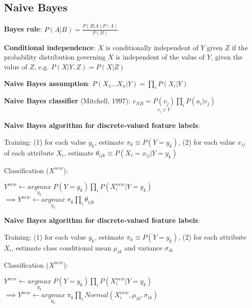 \documentclass[letterpaper,fontsize=5pt]{scrartcl}
\renewenvironment{enumerate}[1]{\begin{compactenum}#1}{\end{compactenum}}
\theoremstyle{definition}
\begin{document}
\begin{multicols}{2}
\section{Naive Bayes}
	\begin{enumerate}
		\item \textbf{Bayes rule}: $P(A|B) = \frac{P(B|A)P(A)}{P(B)}$
		\item \textbf{Conditional independence}: $X$ is conditionally independent of $Y$ given $Z$ if the probability distribution governing $X$ is independent of the value of $Y$, given the value of $Z$, e.g. $P(X|Y,Z) = P(X|Z)$
		\item \textbf{Naive Bayes assumption}: $P(X_1...X_n|Y) = \prod\limits_{i} P(X_i|Y)$
		\item \textbf{Naive Bayes classifier} (Mitchell, 1997): $v_{NB} = \underset{v_j \in V}{P(v_j)} \prod\limits_i P(a_i|v_j)$
		\item \textbf{Naive Bayes algorithm for discrete-valued feature labels}:
			\begin{enumerate}
				\item Training: (1) for each value $y_k$, estimate $\pi_k \equiv P(Y = y_k)$, (2) for each value $x_{ij}$ of each attribute $X_i$, estimate $\theta_{ijk} \equiv P(X_i = x_{ij} | Y = y_k)$
				\item Classification ($X^{new}$): \begin{center} $Y^{new} \leftarrow \underset{y_k}{argmax}\;P(Y=y_k) \prod\limits_i P(X_i^{new}|Y=y_k)$ \\
					$\implies Y^{new} \leftarrow \underset{y_k}{argmax} \; \pi_k \prod\limits_i \theta_{ijk}$ \end{center}
			\end{enumerate}
		\item \textbf{Naive Bayes algorithm for discrete-valued feature labels}:
			\begin{enumerate}
				\item Training: (1) for each value $y_k$, estimate $\pi_k \equiv P(Y = y_k)$, (2) for each attribute $X_i$, estimate class conditional mean $\mu_{ik}$ and variance $\sigma_{ik}$
				\item Classification ($X^{new}$): \begin{center} $Y^{new} \leftarrow \underset{y_k}{argmax}\;P(Y=y_k) \prod\limits_i P(X_i^{new}|Y=y_k)$ \\
					$\implies Y^{new} \leftarrow \underset{y_k}{argmax} \; \pi_k \prod\limits_i Normal(X_i^{new},\mu_{ik},\sigma_{ik})$ \end{center}

\end{enumerate}
\end{enumerate}
\end{multicols}
\end{document}
